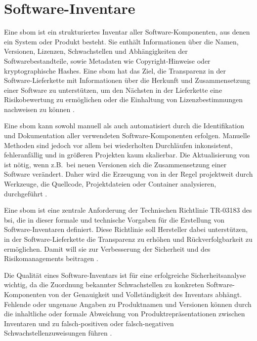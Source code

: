 \section{Software-Inventare}\label{sec:def-inventories}

Eine \acrfull{sbom} ist ein strukturiertes Inventar aller Software-Komponenten, aus denen ein System oder Produkt besteht.
Sie enthält Informationen über die Namen, Versionen, Lizenzen, Schwachstellen und Abhängigkeiten der Softwarebestandteile, sowie Metadaten wie Copyright-Hinweise oder kryptographische Hashes.
Eine \acrshort{sbom} hat das Ziel, die Transparenz in der Software-Lieferkette mit Informationen über die Herkunft und Zusammensetzung einer Software zu unterstützen, um den Nächsten in der Lieferkette eine Risikobewertung zu ermöglichen oder die Einhaltung von Lizenzbestimmungen nachweisen zu können \autocite{Bi_Xia_Xing_Lu_Zhu_2023}.

Eine \acrshort{sbom} kann sowohl manuell als auch automatisiert durch die Identifikation und Dokumentation aller verwendeten Software-Komponenten erfolgen.
Manuelle Methoden sind jedoch vor allem bei wiederholten Durchläufen inkonsistent, fehleranfällig und in größeren Projekten kaum skalierbar.
Die Aktualisierung von  ist nötig, wenn z.B.\ bei neuen Versionen sich die Zusammensetzung einer Software verändert.
Daher wird die Erzeugung von  in der Regel projektweit durch Werkzeuge, die Quellcode, Projektdateien oder Container analysieren, durchgeführt \autocite{Bi_Xia_Xing_Lu_Zhu_2023}.

Eine \acrshort{sbom} ist eine zentrale Anforderung der Technischen Richtlinie TR-03183 des \acrfull{bsi}, die in dieser formale und technische Vorgaben für die Erstellung von Software-Inventaren definiert.
Diese Richtlinie soll Hersteller dabei unterstützen, in der Software-Lieferkette die Transparenz zu erhöhen und Rückverfolgbarkeit zu ermöglichen.
Damit will sie zur Verbesserung der Sicherheit und des Risikomanagements beitragen \autocite{BSI_TR03183}.

Die Qualität eines Software-Inventars ist für eine erfolgreiche Sicherheitsanalyse wichtig, da die Zuordnung bekannter Schwachstellen zu konkreten Software-Komponenten von der Genauigkeit und Vollständigkeit des Inventars abhängt.
Fehlende oder ungenaue Angaben zu Produktnamen und Versionen können durch die inhaltliche oder formale Abweichung von Produktrepräsentationen zwischen Inventaren und  zu falsch-positiven oder falsch-negativen Schwachstellenzuweisungen führen \autocite{Idrissi_Sebai_Faroukhi_Mahouachi_2024}.

